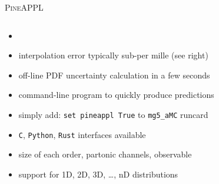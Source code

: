\begin{frame}{\textrm{\textsc{PineAPPL}}}
\begin{columns}[T,onlytextwidth]
\begin{column}{.5\textwidth}
\begin{itemize}
\item {}
\item interpolation error typically sub-per mille (see right)
\item off-line PDF uncertainty calculation in a few seconds
\item command-line program to quickly produce predictions
\item simply add: \texttt{set pineappl True} to \texttt{mg5\_aMC} runcard
\item \texttt{C}, \texttt{Python}, \texttt{Rust} interfaces available
\item size of each order, partonic channels, observable
\item support for 1D, 2D, 3D, \ldots, nD distributions
\end{itemize}

\vspace*{0.5cm}


\end{column}
\end{columns}
\end{frame}
